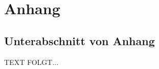 \newpage
\setcounter{section}{0} %
\renewcommand*\thesection{\Alph{section}} %
\section{Anhang}\label{anhang}
\subsection{Unterabschnitt von Anhang}\label{subsec_UabsAnhang}
TEXT FOLGT...